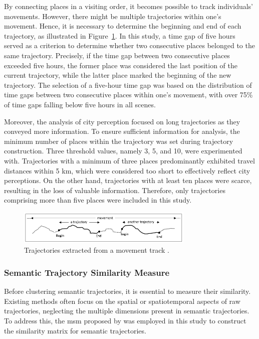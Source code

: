 \documentclass{article}
\theoremstyle{remark}
\begin{document}
By connecting places in a visiting order, it becomes possible to track individuals' movements. However, there might be multiple trajectories within one's movement. Hence, it is necessary to determine the beginning and end of each trajectory, as illustrated in Figure~\ref{fig:trajectory_begin_end}. In this study, a time gap of five hours served as a criterion to determine whether two consecutive places belonged to the same trajectory. Precisely, if the time gap between two consecutive places exceeded five hours, the former place was considered the last position of the current trajectory, while the latter place marked the beginning of the new trajectory. The selection of a five-hour time gap was based on the distribution of time gaps between two consecutive places within one's movement, with over 75\% of time gaps falling below five hours in all scenes. 

Moreover, the analysis of city perception focused on long trajectories as they conveyed more information. To ensure sufficient information for analysis, the minimum number of places within the trajectory was set during trajectory construction. Three threshold values, namely 3, 5, and 10, were experimented with. Trajectories with a minimum of three places predominantly exhibited travel distances within 5 km, which were considered too short to effectively reflect city perceptions. On the other hand, trajectories with at least ten places were scarce, resulting in the loss of valuable information. Therefore, only trajectories comprising more than five places were included in this study.


\begin{figure} [!h]
\centering
\includegraphics[width=0.75\textwidth]{figures/begin_end.png}
\caption{\label{fig:trajectory_begin_end}Trajectories extracted from a movement track \citep{parent_semantic_2013}.}
\end{figure}


\subsubsection{Semantic Trajectory Similarity Measure} \label{traj_similarity}
Before clustering semantic trajectories, it is essential to measure their similarity. Existing methods often focus on the spatial or spatiotemporal aspects of raw trajectories, neglecting the multiple dimensions present in semantic trajectories. To address this, the \acrfull{msm} proposed by \cite{furtado_multidimensional_2016} was employed in this study to construct the similarity matrix for semantic trajectories. 
\end{document}

